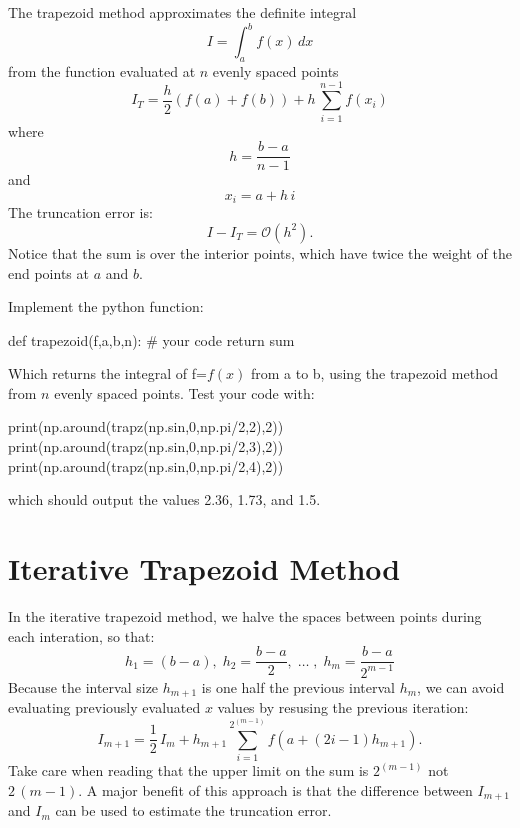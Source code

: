 The trapezoid method approximates the definite integral
\begin{displaymath}
I = \int_a^b f(x) \, dx
\end{displaymath}
from the function evaluated at $n$ evenly spaced points
\begin{displaymath}
I_T =  \frac{h}{2}(f(a) + f(b)) + h \, \sum_{i=1}^{n-1} f(x_i)
\end{displaymath}
where
\begin{displaymath}
h = \frac{b-a}{n-1}
\end{displaymath}
and
\begin{displaymath}
x_i = a + h \, i 
\end{displaymath}
The truncation error is:
\begin{displaymath}
I-I_T = \mathcal{O}(h^2).
\end{displaymath}
Notice that the sum is over the interior points, which have twice the
weight of the end points at $a$ and $b$.

\plot Implement the python function:
\begin{python}
def trapezoid(f,a,b,n):
   # your code
   return sum
\end{python}
Which returns the integral of f=$f(x)$ from a to b, using the
trapezoid method from $n$ evenly spaced points.
Test your code with:
\begin{python}
print(np.around(trapz(np.sin,0,np.pi/2,2),2))
print(np.around(trapz(np.sin,0,np.pi/2,3),2))
print(np.around(trapz(np.sin,0,np.pi/2,4),2))
\end{python}
which should output the values 2.36, 1.73, and 1.5.

\section{Iterative Trapezoid Method}

In the iterative trapezoid method, we halve the spaces between points
during each interation, so that:
\begin{displaymath}
h_1 = (b-a), \; h_2 = \frac{b-a}{2}, \; \ldots \; , \; h_m = \frac{b-a}{2^{m-1}}
\end{displaymath}
Because the interval size $h_{m+1}$ is one half the previous interval
$h_m$, we can avoid evaluating previously evaluated $x$ values by
resusing the previous iteration:
\begin{displaymath}
I_{m+1} = \frac{1}{2} \, I_{m} + h_{m+1}\sum_{i=1}^{2^{(m-1)}} f(a+(2i-1)h_{m+1}).
\end{displaymath}
Take care when reading that the upper limit on the sum is $2^{(m-1)}$
not $2\,(m-1)$.  A major benefit of this approach is that the
difference between $I_{m+1}$ and $I_m$ can be used to estimate the
truncation error.\\

